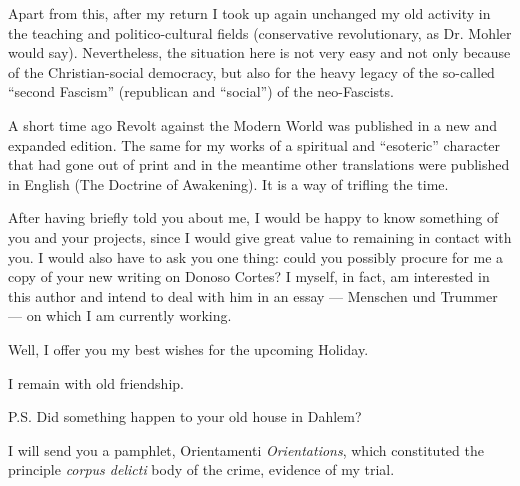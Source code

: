 Apart from this, after my return I took up again unchanged my old activity in the teaching and politico-cultural fields (conservative revolutionary, as Dr. Mohler would say). Nevertheless, the situation here is not very easy and not only because of the Christian-social democracy, but also for the heavy legacy of the so-called ``second Fascism'' (republican and ``social'') of the neo-Fascists.

A short time ago Revolt against the Modern World was published in a new and expanded edition. The same for my works of a spiritual and ``esoteric'' character that had gone out of print and in the meantime other translations were published in English (The Doctrine of Awakening). It is a way of trifling the time.

After having briefly told you about me, I would be happy to know something of you and your projects, since I would give great value to remaining in contact with you. I would also have to ask you one thing: could you possibly procure for me a copy of your new writing on Donoso Cortes? I myself, in fact, am interested in this author and intend to deal with him in an essay --- Menschen und Trummer --- on which I am currently working.

Well, I offer you my best wishes for the upcoming Holiday.

I remain with old friendship.

P.S. Did something happen to your old house in Dahlem?

I will send you a pamphlet, Orientamenti \emph{Orientations}, which constituted the principle \emph{corpus delicti} body of the crime, evidence of my trial.



